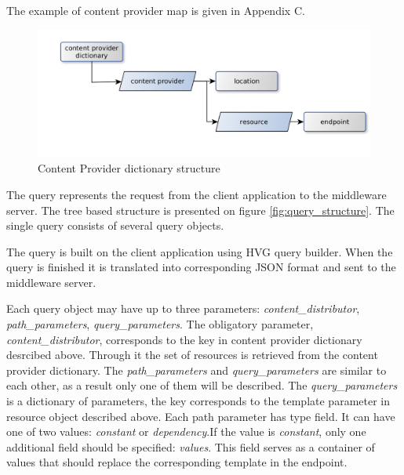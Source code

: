 The example of content provider map is given in Appendix C.


\begin{figure}[h]
    \centering
	\includegraphics[width=\textwidth]{images/content_provider_map.png}
    \caption{Content Provider dictionary structure}
    \label{fig:content_provider_map}
\end{figure}


The query represents the request from the client application to the middleware server. The tree based structure is presented on figure \ref{fig:query_structure}. The single query consists of several query objects.

The query is built on the client application using HVG query builder. When the query is finished it is translated into corresponding JSON format and sent to the middleware server.

Each query object may have up to three parameters: \textit{content\_distributor}, \textit{path\_parameters}, \textit{query\_parameters}. The obligatory parameter, \textit{content\_distributor}, corresponds to the key in content provider dictionary desrcibed above. Through it the set of resources is retrieved from the content provider dictionary. The \textit{path\_parameters} and \textit{query\_parameters} are similar to each other, as a result only one of them will be described. The \textit{query\_parameters} is a dictionary of parameters, the key corresponds to the template parameter in resource object described above. Each path parameter has type field. It can have one of two values: \textit{constant} or \textit{dependency}.If the value is \textit{constant}, only one additional field should be specified: \textit{values}. This field serves as a container of values that should replace the corresponding template in the endpoint. 


